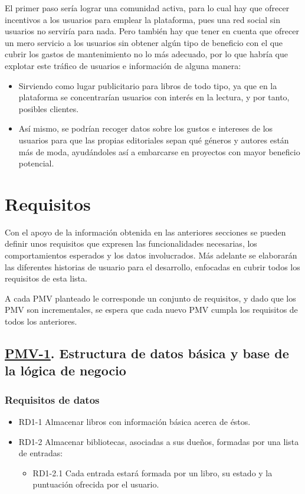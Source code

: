 El primer paso sería lograr una comunidad activa, para lo cual hay que ofrecer incentivos a los usuarios para emplear la plataforma, pues una red social sin usuarios no serviría para nada. Pero también hay que tener en cuenta que ofrecer un mero servicio a los usuarios sin obtener algún tipo de beneficio con el que cubrir los gastos de mantenimiento no lo más adecuado, por lo que habría que explotar este tráfico de usuarios e información de alguna manera:

\begin{itemize}
    \item Sirviendo como lugar publicitario para libros de todo tipo, ya que en la plataforma se concentrarían usuarios con interés en la lectura, y por tanto, posibles clientes.
    \item Así mismo, se podrían recoger datos sobre los gustos e intereses de los usuarios para que las propias editoriales sepan qué géneros y autores están más de moda, ayudándoles así a embarcarse en proyectos con mayor beneficio potencial.
\end{itemize} 

\section{Requisitos}

Con el apoyo de la información obtenida en las anteriores secciones se pueden definir unos requisitos que expresen las funcionalidades necesarias, los comportamientos esperados y los datos involucrados. Más adelante se elaborarán las diferentes historias de usuario para el desarrollo, enfocadas en cubrir todos los requisitos de esta lista.

A cada PMV planteado le corresponde un conjunto de requisitos, y dado que los PMV son incrementales, se espera que cada nuevo PMV cumpla los requisitos de todos los anteriores.

\subsection{\href{https://github.com/Anglepi/My-Many-Reads/milestone/2}{PMV-1}. Estructura de datos básica y base de la lógica de negocio}

\subsubsection{Requisitos de datos}
\begin{itemize}
    \item RD1-1 Almacenar libros con información básica acerca de éstos.
    \item RD1-2 Almacenar bibliotecas, asociadas a sus dueños, formadas por una lista de entradas:
    \begin{itemize}
        \item RD1-2.1 Cada entrada estará formada por un libro, su estado y la puntuación ofrecida por el usuario.
    \end{itemize}
\end{itemize}

